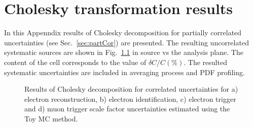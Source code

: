 \chapter{Cholesky transformation results}\label{app:Chol}
In this Appenndix results of Cholesky decomposition for partially correlated uncertainties (see Sec.~\ref{sec:partCor}) are presented. The resulting uncorrelated systematic sources are shown in Fig.~\ref{fig:AppA} in source vs the analysis plane. The content of the cell corresponds to the value of $\delta C/C (\%)$.  The resulted systematic uncertainties are included in averaging process and PDF profiling.

\begin{figure}[!h]
\begin{minipage}[h]{0.35\linewidth}
\end{minipage}
\hfill
\begin{minipage}[h]{0.35\linewidth}
\end{minipage}
\vfill
\begin{minipage}[h]{0.35\linewidth}
\end{minipage}
\hfill
\begin{minipage}[h]{0.35\linewidth}
\end{minipage}
\caption{Results of Cholesky decomposition for correlated uncertainties for a) electron reconstruction, b) electron identification, c) electron trigger and d) muon trigger scale factor uncertainties estimated using the Toy MC method.}
\label{fig:AppA}
\end{figure}